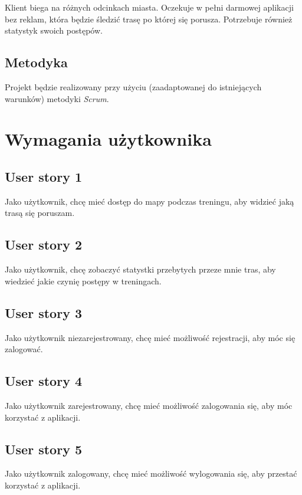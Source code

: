 \documentclass[a4paper]{article}
\begin{document}
Klient biega na różnych odcinkach miasta. Oczekuje w pełni darmowej aplikacji bez reklam, która będzie śledzić trasę po której się porusza. Potrzebuje również statystyk swoich postępów.

\subsection{Metodyka}

Projekt będzie realizowany przy użyciu (zaadaptowanej do istniejących warunków) metodyki {\em Scrum}.

\section{Wymagania użytkownika}

\subsection{User story 1}
Jako użytkownik, chcę mieć dostęp do mapy podczas treningu, aby widzieć jaką trasą się poruszam.

\subsection{User story 2}
Jako użytkownik, chcę zobaczyć statystki przebytych przeze mnie tras, aby wiedzieć jakie czynię postępy w treningach.

\subsection{User story 3}
Jako użytkownik niezarejestrowany, chcę mieć możliwość rejestracji, aby móc się zalogować.

\subsection{User story 4}
Jako użytkownik zarejestrowany, chcę mieć możliwość zalogowania się, aby móc korzystać z aplikacji.

\subsection{User story 5}
Jako użytkownik zalogowany, chcę mieć możliwość wylogowania się, aby przestać korzystać z aplikacji.
\end{document}
